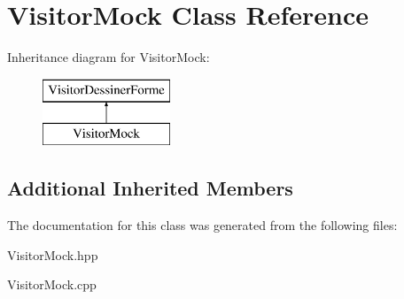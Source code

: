 \hypertarget{class_visitor_mock}{}\section{Visitor\+Mock Class Reference}
\label{class_visitor_mock}
Inheritance diagram for Visitor\+Mock\+:\begin{figure}[H]
\begin{center}
\leavevmode
\includegraphics[height=2.000000cm]{class_visitor_mock}
\end{center}
\end{figure}
\subsection*{Additional Inherited Members}


The documentation for this class was generated from the following files\+:\begin{DoxyCompactItemize}
\item 
Visitor\+Mock.\+hpp\item 
Visitor\+Mock.\+cpp\end{DoxyCompactItemize}
